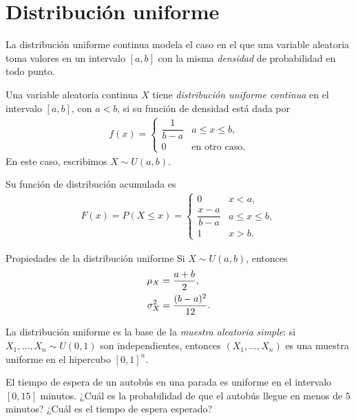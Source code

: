 
\section{Distribución uniforme}

La distribución uniforme continua modela el caso en el que una variable aleatoria toma
valores en un intervalo $[a,b]$ con la misma \emph{densidad} de probabilidad en todo punto.

\begin{definicion}
Una variable aleatoria continua $X$ tiene \emph{distribución uniforme continua} en el
intervalo $[a,b]$, con $a<b$, si su función de densidad está dada por
\begin{align}
 \label{eq:2.8.1}
 f(x) =
 \begin{cases}
  \dfrac{1}{b-a} & a \leq x \leq b, \\
  0 & \text{en otro caso.}
 \end{cases}
\end{align}
En este caso, escribimos $X \sim U(a,b)$.
\end{definicion}

Su función de distribución acumulada es
\begin{align}
 \label{eq:2.8.2}
 F(x) = P(X \leq x) =
 \begin{cases}
  0 & x < a, \\
  \dfrac{x-a}{b-a} & a \leq x \leq b, \\
  1 & x > b.
 \end{cases}
\end{align}

{Propiedades de la distribución uniforme} Si $X \sim U(a,b)$, entonces
\begin{align}
 \mu_X &= \frac{a+b}{2}, \\
 \sigma_X^2 &= \frac{(b-a)^2}{12}.
\end{align}

\begin{observacion}
La distribución uniforme es la base de la \emph{muestra aleatoria simple}: si
$X_1,\dots,X_n \sim U(0,1)$ son independientes, entonces $(X_1,\dots,X_n)$ es una muestra
uniforme en el hipercubo $[0,1]^n$.
\end{observacion}

\begin{ejemplo}
 \label{exmp:2.8.1}
El tiempo de espera de un autobús en una parada es uniforme en el intervalo
$[0,15]$ minutos. ¿Cuál es la probabilidad de que el autobús llegue en menos de
$5$ minutos? ¿Cuál es el tiempo de espera esperado?
\end{ejemplo}

